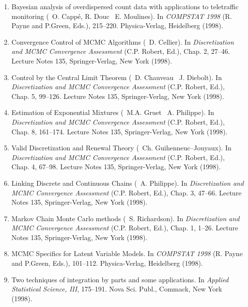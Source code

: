\begin{enumerate}
\item Bayesian analysis of overdispersed count data with applications to teletraffic
monitoring (\avec\ O. Capp\'e, R. Douc \et\ E. Moulines).
In {\it COMPSTAT 1998} (R. Payne and P.Green, Eds.), 215--220. Physica-Verlag, Heidelberg (1998).

\item Convergence Control of MCMC Algorithms (\avec\ D. Cellier).
In {\it Discretization and MCMC Convergence Assessment}
(C.P. Robert, Ed.), Chap. 2, 27--46. 
Lecture Notes 135, Springer-Verlag, New York (1998).     

\item Control by the Central Limit Theorem (\avec\ D. Chauveau \et\
J. Diebolt). In {\it Discretization and MCMC Convergence Assessment}
(C.P. Robert, Ed.), Chap. 5, 99--126.
Lecture Notes 135, Springer-Verlag, New York (1998).

\item Estimation of Exponential Mixtures (\avec\ M.A. Gruet \et\
A. Philippe). In {\it Discretization and MCMC Convergence Assessment}
(C.P. Robert, Ed.), Chap. 8, 161--174.
Lecture Notes 135, Springer-Verlag, New York (1998).

\item Valid Discretization and Renewal Theory (\avec\ Ch. Guihenneuc--Jouyaux). 
In {\it Discretization and MCMC Convergence Assessment}
(C.P. Robert, Ed.), Chap. 4, 67--98. 
Lecture Notes 135, Springer-Verlag, New York (1998).     

\item Linking Discrete and Continuous Chains (\avec\ A. Philippe).
In {\it Discretization and MCMC Convergence Assessment}
(C.P. Robert, Ed.), Chap. 3, 47--66. 
Lecture Notes 135, Springer-Verlag, New York (1998).     

\item Markov Chain Monte Carlo methods (\avec\ S. Richardson).
In {\it Discretization and MCMC Convergence Assessment}
(C.P. Robert, Ed.), Chap. 1, 1--26. 
Lecture Notes 135, Springer-Verlag, New York (1998).     

\item MCMC Specifics for Latent Variable Models. In {\it COMPSTAT 1998}
(R. Payne and P.Green, Eds.), 101--112. Physica-Verlag, Heidelberg (1998).

\item Two techniques of integration by parts and some
applications. In {\it Applied Statistical Science, III}, 175--191.
Nova Sci. Publ., Commack, New York (1998). 


\end{enumerate}
